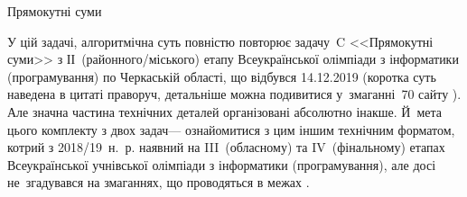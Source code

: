 \begin{problemAllDefault}{Прямокутні суми}


У цій задачі, алгоритмічна суть повністю повторює задачу~C <<Прямокутні суми>> з ІІ~(районного/\nolinebreak[3]міського) етапу Всеукраїнської олімпіади з інформатики (програмування) по Черкаській області, що відбувся 14.12.2019 (коротка суть наведена в цитаті праворуч, детальніше можна подивитися у~змаганні~70 сайту \EjudgeCkipoName). 
%
Але значна частина технічних деталей організовані абсолютно інакше. Й~мета цього комплекту з двох задач\nolinebreak[3] --- ознайомитися з цим іншим технічним форматом, котрий з 2018/19~н.~р. наявний на III~(обласному) та IV~(фінальному) етапах Всеукраїнської учнівської олімпіади з інформатики (програмування), але досі не~згадувався на змаганнях, що проводяться в межах \EjudgeCkipoName.


\end{problemAllDefault}
